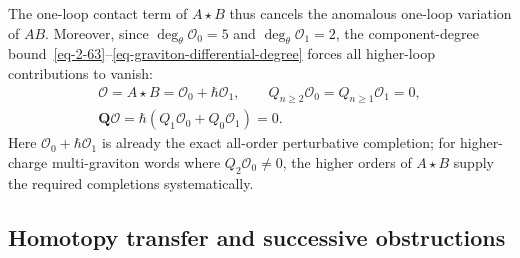 \documentclass[11pt]{article}
\numberwithin{equation}{section}
\numberwithin{figure}{section}
\numberwithin{table}{section}
\begin{document}
The one-loop contact term of $A\star B$ thus cancels the anomalous one-loop variation of $AB$. Moreover, since $\deg_\theta\mathcal O_0=5$ and $\deg_\theta\mathcal O_1=2$, the component-degree bound~\eqref{eq-2-63}--\eqref{eq-graviton-differential-degree} forces all higher-loop contributions to vanish:
\begin{equation}\label{eq-finiteexample}
\begin{gathered}
\mathcal O=A\star B=\mathcal O_0+\hbar\mathcal O_1,\qquad
Q_{n\ge2}\mathcal O_0=Q_{n\ge1}\mathcal O_1=0,\\
\mathbf Q\mathcal O
=\hbar(Q_1\mathcal O_0+Q_0\mathcal O_1)=0.
\end{gathered}
\end{equation}
Here $\mathcal O_0+\hbar\mathcal O_1$ is already the exact all-order perturbative completion; for higher-charge multi-graviton words where $Q_2\mathcal O_0\ne0$, the higher orders of $A\star B$ supply the required completions systematically.

\subsection{Homotopy transfer and successive obstructions}\label{sec-homotopy-transfer}
\end{document}
